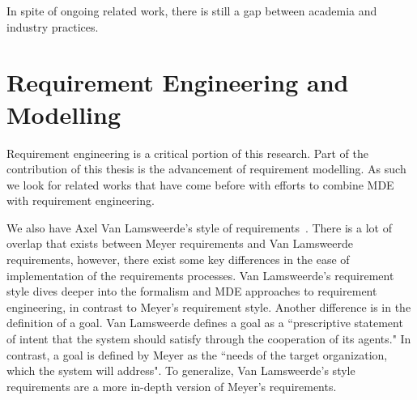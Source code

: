 In spite of ongoing related work, there is still a gap between academia and industry practices.

\section{Requirement Engineering and Modelling}

Requirement engineering is a critical portion of this research. Part of the contribution of this thesis is the advancement of requirement modelling. As such we look for related works that have come before with efforts to combine \ac{MDE} with requirement engineering.

We also have Axel Van Lamsweerde's style of requirements~\cite{lamsweerde2009requirements}. There is a lot of overlap that exists between Meyer requirements and Van Lamsweerde requirements, however, there exist some key differences in the ease of implementation of the requirements processes. Van Lamsweerde's requirement style dives deeper into the formalism and MDE approaches to requirement engineering, in contrast to Meyer's requirement style. Another difference is in the definition of a goal. Van Lamsweerde defines a goal as a ``prescriptive statement of intent that the system should satisfy through the cooperation of its agents." In contrast, a goal is defined by Meyer as the ``needs of the target organization, which the system will address". To generalize, Van Lamsweerde's style requirements are a more in-depth version of Meyer's requirements. 

